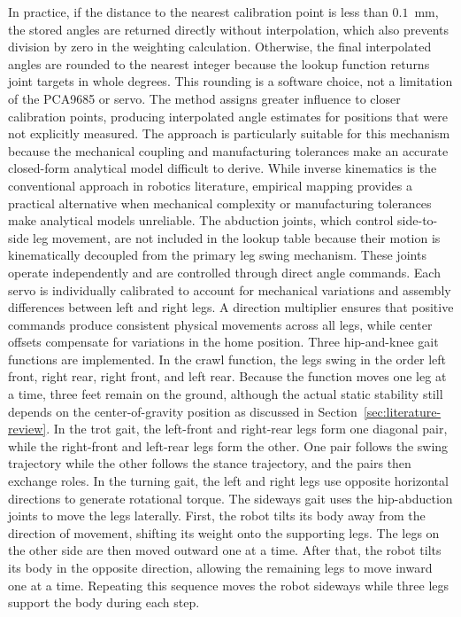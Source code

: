 \documentclass[a4paper,12pt]{report}
\begin{document}
In practice, if the distance to the nearest calibration point is less than $0.1$~mm, the stored
angles are returned directly without interpolation, which also prevents division by zero in the
weighting calculation. Otherwise, the final interpolated angles are rounded to the nearest integer
because the lookup function returns joint targets in whole degrees. This rounding is a software
choice, not a limitation of the PCA9685 or servo. The method assigns greater influence to closer
calibration points, producing interpolated angle estimates for positions that were not explicitly
measured. The approach is particularly suitable for this mechanism because the mechanical coupling
and manufacturing tolerances make an accurate closed-form analytical model difficult to derive.
While inverse kinematics is the conventional approach in robotics literature, empirical mapping
provides a practical alternative when mechanical complexity or manufacturing tolerances make
analytical models unreliable. The abduction joints, which control side-to-side leg movement, are not
included in the lookup table because their motion is kinematically decoupled from the primary leg
swing mechanism. These joints operate independently and are controlled through direct angle
commands. Each servo is individually calibrated to account for mechanical variations and assembly
differences between left and right legs. A direction multiplier ensures that positive commands
produce consistent physical movements across all legs, while center offsets compensate for
variations in the home position. Three hip-and-knee gait functions are implemented. In the crawl
function, the legs swing in the order left front, right rear, right front, and left rear. Because
the function moves one leg at a time, three feet remain on the ground, although the actual static
stability still depends on the center-of-gravity position as discussed in
Section~\ref{sec:literature-review}. In the trot gait, the left-front and right-rear legs form one
diagonal pair, while the right-front and left-rear legs form the other. One pair follows the swing
trajectory while the other follows the stance trajectory, and the pairs then exchange roles. In the
turning gait, the left and right legs use opposite horizontal directions to generate rotational
torque. The sideways gait uses the hip-abduction joints to move the legs laterally. First, the robot
tilts its body away from the direction of movement, shifting its weight onto the supporting legs.
The legs on the other side are then moved outward one at a time. After that, the robot tilts its
body in the opposite direction, allowing the remaining legs to move inward one at a time. Repeating
this sequence moves the robot sideways while three legs support the body during each step.
\end{document}
